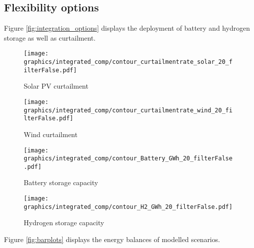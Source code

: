 \subsection{Flexibility options}
Figure \ref{fig:integration_options} displays the deployment of battery and hydrogen storage as well as curtailment.

\begin{figure*}[t] %
    \centering
    \begin{subfigure}[b]{0.45\linewidth}
        \centering
        \texttt{[image: graphics/integrated\_comp/contour\_curtailmentrate\_solar\_20\_filterFalse.pdf]}
        \caption{Solar PV curtailment}
        \label{fig:solar_curt}
    \end{subfigure}
    \hfill
    \begin{subfigure}[b]{0.45\linewidth}
        \centering
        \texttt{[image: graphics/integrated\_comp/contour\_curtailmentrate\_wind\_20\_filterFalse.pdf]}
        \caption{Wind curtailment}
        \label{fig:wind_curt}
    \end{subfigure}
    \hfill
    \begin{subfigure}[b]{0.45\linewidth}
        \centering
        \texttt{[image: graphics/integrated\_comp/contour\_Battery\_GWh\_20\_filterFalse.pdf]}
        \caption{Battery storage capacity}
        \label{fig:battery_cap}
    \end{subfigure}
    \hfill
    \begin{subfigure}[b]{0.45\linewidth}
        \centering
        \texttt{[image: graphics/integrated\_comp/contour\_H2\_GWh\_20\_filterFalse.pdf]}
        \caption{Hydrogen storage capacity}
        \label{fig:hystorage_cap}
    \end{subfigure}
    \hfill

    \caption{Curtailment rates and storage capacities}
    \label{fig:integration_options}
\end{figure*}

Figure \ref{fig:barplots} displays the energy balances of modelled scenarios.


